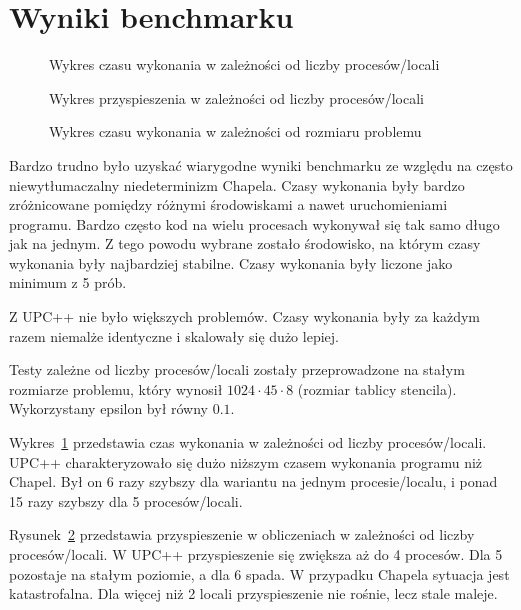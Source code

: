 \section{Wyniki benchmarku}

\begin{figure}
    \centering
    
    \caption{Wykres czasu wykonania w zależności od liczby procesów/locali}
    \label{fig:stencil-times}
\end{figure}

\begin{figure}
    \centering
    
    \caption{Wykres przyspieszenia w zależności od liczby procesów/locali}
    \label{fig:stencil-speedup}
\end{figure}

\begin{figure}
    \centering
    
    \caption{Wykres czasu wykonania w zależności od rozmiaru problemu}
    \label{fig:stencil-seq}
\end{figure}

Bardzo trudno było uzyskać wiarygodne wyniki benchmarku ze względu na
często niewytłumaczalny niedeterminizm Chapela.
Czasy wykonania były bardzo zróżnicowane pomiędzy różnymi środowiskami
a nawet uruchomieniami programu.
Bardzo często kod na wielu procesach wykonywał się tak samo długo jak na jednym.
Z tego powodu wybrane zostało środowisko, na którym czasy wykonania były
najbardziej stabilne.
Czasy wykonania były liczone jako minimum z 5 prób.

Z UPC++ nie było większych problemów.
Czasy wykonania były za każdym razem niemalże identyczne
i skalowały się dużo lepiej.

Testy zależne od liczby procesów/locali zostały przeprowadzone na stałym
rozmiarze problemu, który wynosił $1024 \cdot 45 \cdot 8$ (rozmiar tablicy stencila).
Wykorzystany epsilon był równy $0.1$.

Wykres~\ref{fig:stencil-times} przedstawia czas wykonania w zależności od liczby
procesów/locali.
UPC++ charakteryzowało się dużo niższym czasem wykonania programu niż
Chapel.
Był on 6 razy szybszy dla wariantu na jednym procesie/localu,
i ponad 15 razy szybszy dla 5 procesów/locali.

Rysunek~\ref{fig:stencil-speedup} przedstawia przyspieszenie w obliczeniach
w zależności od liczby procesów/locali.
W UPC++ przyspieszenie się zwiększa aż do 4 procesów.
Dla 5 pozostaje na stałym poziomie, a dla 6 spada.
W przypadku Chapela sytuacja jest katastrofalna.
Dla więcej niż 2 locali przyspieszenie nie rośnie, lecz stale maleje.

